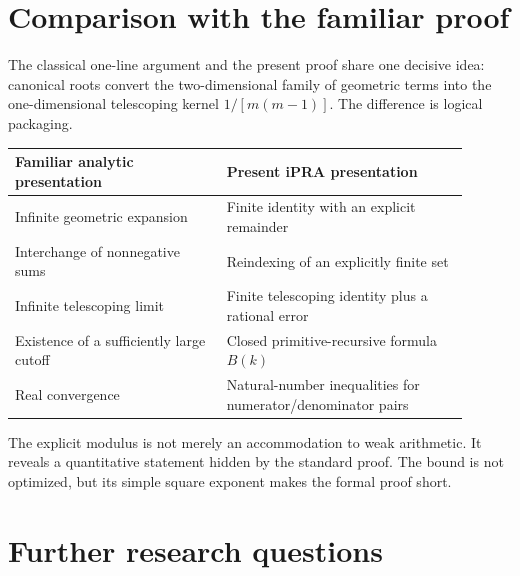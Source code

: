 \documentclass[11pt]{article}
\theoremstyle{definition}
\begin{document}
\section{Comparison with the familiar proof}

The classical one-line argument and the present proof share one decisive idea:
canonical roots convert the two-dimensional family of geometric terms into the
one-dimensional telescoping kernel $1/[m(m-1)]$.  The difference is logical
packaging.

\begin{center}
\begin{tabular}{p{0.42\linewidth}p{0.48\linewidth}}
\toprule
Familiar analytic presentation & Present iPRA presentation\\
\midrule
Infinite geometric expansion & Finite identity with an explicit remainder\\
Interchange of nonnegative sums & Reindexing of an explicitly finite set\\
Infinite telescoping limit & Finite telescoping identity plus a rational error\\
Existence of a sufficiently large cutoff & Closed primitive-recursive formula $B(k)$\\
Real convergence & Natural-number inequalities for numerator/denominator pairs\\
\bottomrule
\end{tabular}
\end{center}

The explicit modulus is not merely an accommodation to weak arithmetic.  It
reveals a quantitative statement hidden by the standard proof.  The bound is
not optimized, but its simple square exponent makes the formal proof short.

\section{Further research questions}
\end{document}
